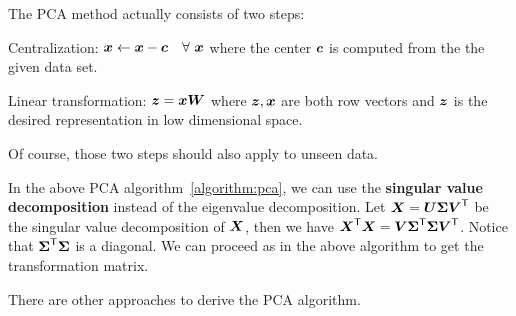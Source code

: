 \begin{re}
    The PCA method actually consists of two steps:
    \begin{compactenum}
        \item Centralization: $\boldsymbol{x} \gets \boldsymbol{x} -\boldsymbol{c}\quad\forall~\boldsymbol{x}$ where the center $\boldsymbol{c}$ is computed
        from the the given data set.
        \item Linear transformation: $\boldsymbol{z} = \boldsymbol{x} \boldsymbol{W}$ where $\boldsymbol{z}, \boldsymbol{x}$ are both row vectors and
        $\boldsymbol{z}$ is the desired representation in low dimensional space.
    \end{compactenum}
    Of course, those two steps should also apply to unseen data.
\end{re}

\begin{re}
    In the above PCA algorithm~\ref{algorithm:pca}, we can use the \textbf{singular value decomposition}
    instead of the eigenvalue decomposition. Let $\boldsymbol{X} = \boldsymbol{U}\boldsymbol{\Sigma}{\boldsymbol{V}}^\mathsf{T}$ be the singular value 
    decomposition of $\boldsymbol{X}$, then we have ${\boldsymbol{X}}^\mathsf{T}\boldsymbol{X} = \boldsymbol{V} {\boldsymbol{\Sigma}}^\mathsf{T}\boldsymbol{\Sigma} {\boldsymbol{V}}^\mathsf{T}$. Notice
    that ${\boldsymbol{\Sigma}}^\mathsf{T}\boldsymbol{\Sigma}$ is a diagonal. We can proceed as in the above algorithm to get the
    transformation matrix.
\end{re}

There are other approaches to derive the PCA algorithm.